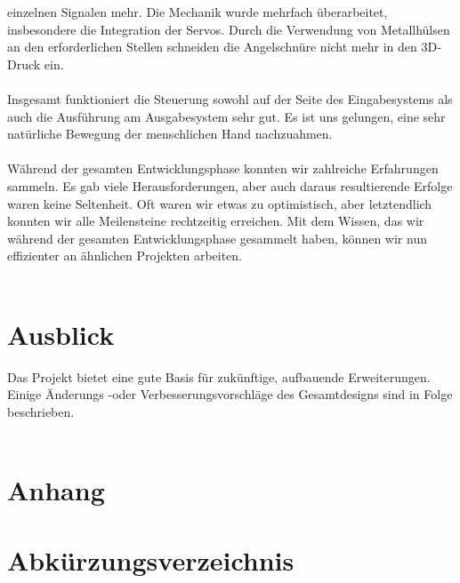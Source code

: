 \documentclass[titlepage,12pt,twoside]{article}
\begin{document}
einzelnen Signalen mehr. Die Mechanik wurde mehrfach überarbeitet, insbesondere 
die Integration der Servos. Durch die Verwendung von Metallhülsen an den erforderlichen 
Stellen schneiden die Angelschnüre nicht mehr in den 3D-Druck ein. \\
\\
Insgesamt funktioniert die Steuerung sowohl auf der Seite des Eingabesystems 
als auch die Ausführung am Ausgabesystem sehr gut. Es ist uns gelungen, eine 
sehr natürliche Bewegung der menschlichen Hand nachzuahmen. \\
\\
Während der gesamten Entwicklungsphase konnten wir zahlreiche Erfahrungen 
sammeln. Es gab viele Herausforderungen, aber auch daraus resultierende 
Erfolge waren keine Seltenheit. Oft waren wir etwas zu optimistisch, aber 
letztendlich konnten wir alle Meilensteine rechtzeitig erreichen. Mit dem 
Wissen, das wir während der gesamten Entwicklungsphase gesammelt haben, können
 wir nun effizienter an ähnlichen Projekten arbeiten. \\
 \\

\newpage
\section{Ausblick}

Das Projekt bietet eine gute Basis für zukünftige, aufbauende Erweiterungen. Einige Änderungs -oder Verbesserungsvorschläge des Gesamtdesigns sind in Folge beschrieben. \\
\\


\newpage
\section{Anhang}
\section{Abkürzungsverzeichnis}
\end{document}
